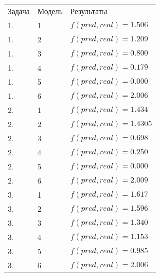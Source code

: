 \documentclass[a4paper,12pt,twoside]{article}
\begin{document}
		\begin{table}[ht!]
			\begin{tabular}{lll}
				Задача &  Модель & Результаты \\
				1. & 1 & $f(pred, real) = 1.506$\\
				1. & 2 & $f(pred, real) = 1.209$\\
				1. & 3 & $f(pred, real) = 0.800$\\
				1. & 4 & $f(pred, real) = 0.179$\\
				1. & 5 & $f(pred, real) = 0.000$\\
				1. & 6 & $f(pred, real) = 2.006$\\
				
				2. & 1 & $f(pred, real) = 1.434$\\
				2. & 2 & $f(pred, real) = 1.4305$\\
				2. & 3 & $f(pred, real) = 0.698$\\
				2. & 4 & $f(pred, real) = 0.250$\\
				2. & 5 & $f(pred, real) = 0.000$\\
				2. & 6 & $f(pred, real) = 2.009$\\
				
				3. & 1 & $f(pred, real) = 1.617$\\
				3. & 2 & $f(pred, real) = 1.596$\\
				3. & 3 & $f(pred, real) = 1.340$\\
				3. & 4 & $f(pred, real) = 1.153$\\
				3. & 5 & $f(pred, real) = 0.985$\\
				3. & 6 & $f(pred, real) = 2.006$\\
			
			\end{tabular}
		\end{table}
	
\end{document}
